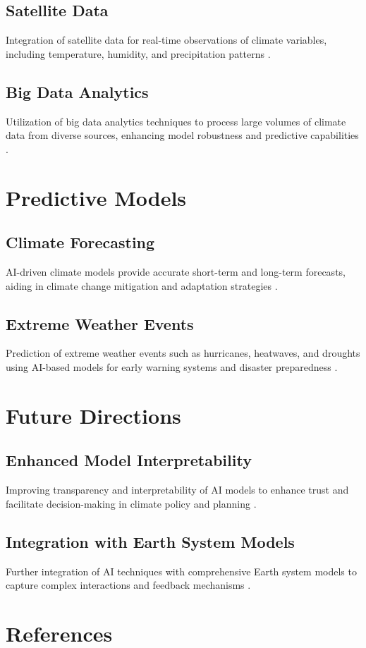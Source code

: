 \documentclass[12pt]{article}
\begin{document}
\subsection{Satellite Data}
Integration of satellite data for real-time observations of climate variables, including temperature, humidity, and precipitation patterns \citep{weng2020integration, koch2021satellite}.

\subsection{Big Data Analytics}
Utilization of big data analytics techniques to process large volumes of climate data from diverse sources, enhancing model robustness and predictive capabilities \citep{ramos2019big, wang2020big}.

\section{Predictive Models}
\subsection{Climate Forecasting}
AI-driven climate models provide accurate short-term and long-term forecasts, aiding in climate change mitigation and adaptation strategies \citep{roberts2018ai, sanchez2019advances}.

\subsection{Extreme Weather Events}
Prediction of extreme weather events such as hurricanes, heatwaves, and droughts using AI-based models for early warning systems and disaster preparedness \citep{wang2018deep, hawkins2019high}.

\section{Future Directions}
\subsection{Enhanced Model Interpretability}
Improving transparency and interpretability of AI models to enhance trust and facilitate decision-making in climate policy and planning \citep{rollinson2020interpretable, arribas2021interpretable}.

\subsection{Integration with Earth System Models}
Further integration of AI techniques with comprehensive Earth system models to capture complex interactions and feedback mechanisms \citep{schneider2020earth, koch2021earth}.

\section*{References}


\end{document}
